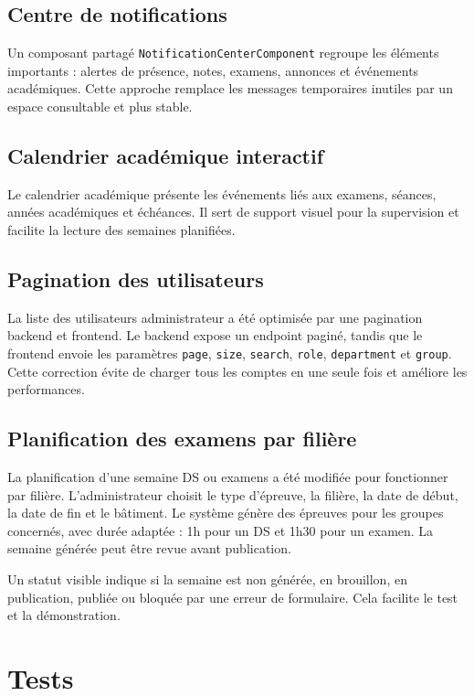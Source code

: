 \documentclass[12pt,a4paper]{report}
\begin{document}
\subsection*{Centre de notifications}

Un composant partagé \texttt{NotificationCenterComponent} regroupe les éléments importants : alertes de présence, notes, examens, annonces et événements académiques. Cette approche remplace les messages temporaires inutiles par un espace consultable et plus stable.

\subsection*{Calendrier académique interactif}

Le calendrier académique présente les événements liés aux examens, séances, années académiques et échéances. Il sert de support visuel pour la supervision et facilite la lecture des semaines planifiées.

\subsection*{Pagination des utilisateurs}

La liste des utilisateurs administrateur a été optimisée par une pagination backend et frontend. Le backend expose un endpoint paginé, tandis que le frontend envoie les paramètres \texttt{page}, \texttt{size}, \texttt{search}, \texttt{role}, \texttt{department} et \texttt{group}. Cette correction évite de charger tous les comptes en une seule fois et améliore les performances.

\subsection*{Planification des examens par filière}

La planification d'une semaine DS ou examens a été modifiée pour fonctionner par filière. L'administrateur choisit le type d'épreuve, la filière, la date de début, la date de fin et le bâtiment. Le système génère des épreuves pour les groupes concernés, avec durée adaptée : 1h pour un DS et 1h30 pour un examen. La semaine générée peut être revue avant publication.

Un statut visible indique si la semaine est non générée, en brouillon, en publication, publiée ou bloquée par une erreur de formulaire. Cela facilite le test et la démonstration.

\section{Tests}
\end{document}

